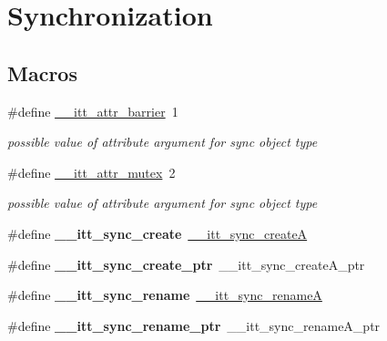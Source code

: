 \hypertarget{group__sync}{}\section{Synchronization}
\label{group__sync}
\subsection*{Macros}
\begin{DoxyCompactItemize}
\item 
\hypertarget{group__sync_gaa2de2b08cecad1d567b5312c503ad217}{}\#define \hyperlink{group__sync_gaa2de2b08cecad1d567b5312c503ad217}{\+\_\+\+\_\+itt\+\_\+attr\+\_\+barrier}~1\label{group__sync_gaa2de2b08cecad1d567b5312c503ad217}

\begin{DoxyCompactList}\small\item\em possible value of attribute argument for sync object type \end{DoxyCompactList}\item 
\hypertarget{group__sync_ga8c78a4fc23e9e2ed0f3d19cd92c7a60d}{}\#define \hyperlink{group__sync_ga8c78a4fc23e9e2ed0f3d19cd92c7a60d}{\+\_\+\+\_\+itt\+\_\+attr\+\_\+mutex}~2\label{group__sync_ga8c78a4fc23e9e2ed0f3d19cd92c7a60d}

\begin{DoxyCompactList}\small\item\em possible value of attribute argument for sync object type \end{DoxyCompactList}\item 
\hypertarget{group__sync_gaa7e7aa1f544a4a08faee32b776d534b1}{}\#define {\bfseries \+\_\+\+\_\+itt\+\_\+sync\+\_\+create}~\hyperlink{group__sync_ga243666487ff4b8904f1629fa15782af4}{\+\_\+\+\_\+itt\+\_\+sync\+\_\+create\+A}\label{group__sync_gaa7e7aa1f544a4a08faee32b776d534b1}

\item 
\hypertarget{group__sync_gab7f1ba7abf5c98e0e0e0ea53d0e34661}{}\#define {\bfseries \+\_\+\+\_\+itt\+\_\+sync\+\_\+create\+\_\+ptr}~\+\_\+\+\_\+itt\+\_\+sync\+\_\+create\+A\+\_\+ptr\label{group__sync_gab7f1ba7abf5c98e0e0e0ea53d0e34661}

\item 
\hypertarget{group__sync_gac8b1ff0b07abb7867832206f7de355ea}{}\#define {\bfseries \+\_\+\+\_\+itt\+\_\+sync\+\_\+rename}~\hyperlink{group__sync_ga8e0ee60520e20d33f9dce510b978bb3b}{\+\_\+\+\_\+itt\+\_\+sync\+\_\+rename\+A}\label{group__sync_gac8b1ff0b07abb7867832206f7de355ea}

\item 
\hypertarget{group__sync_ga1983a053576fe0172533423524e259b0}{}\#define {\bfseries \+\_\+\+\_\+itt\+\_\+sync\+\_\+rename\+\_\+ptr}~\+\_\+\+\_\+itt\+\_\+sync\+\_\+rename\+A\+\_\+ptr\label{group__sync_ga1983a053576fe0172533423524e259b0}

\end{DoxyCompactItemize}
